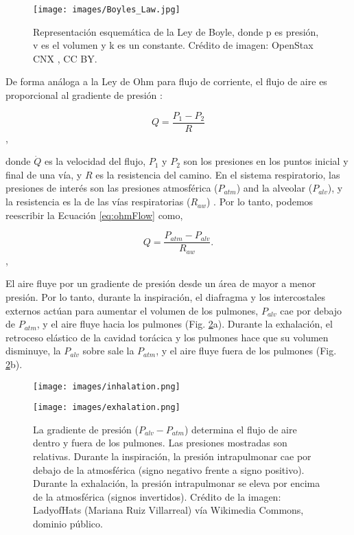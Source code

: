 \documentclass[12pt]{article}
\begin{document}
\begin{figure}[h!]
\centering
\texttt{[image: images/Boyles\_Law.jpg]}
\caption{Representación esquemática de la Ley de Boyle, donde p es
  presión, v es el volumen y k es un constante. Crédito de imagen:
  OpenStax CNX \cite{openStax2016resp}, CC BY.}
\label{fig:boyle}
\end{figure}

De forma análoga a la Ley de Ohm para flujo de corriente, el flujo de
aire es proporcional al gradiente de presión
\cite{sanchez2010respiratory}:

\begin{equation}
Q= \frac{P_1 - P_2}{R}
\label{eq:ohmFlow}
\end{equation},

donde $\dot{Q}$ es la velocidad del flujo, $P_1$ y $P_2$ son los
presiones en los puntos inicial y final de una vía, y $R$ es la
resistencia del camino. En el sistema respiratorio, las presiones de
interés son las presiones atmosférica ($P_{atm}$) and la alveolar
($P_{alv}$), y la resistencia es la de las vías respiratorias
($R_{aw}$) \cite{sanchez2010respiratory}. Por lo tanto, podemos
reescribir la Ecuación \ref{eq:ohmFlow} como,

\begin{equation}
Q= \frac{P_{atm} - P_{alv}}{R_{aw}}.
\label{eq:ohmFlowResp}
\end{equation},

El aire fluye por un gradiente de presión desde un área de mayor a
menor presión. Por lo tanto, durante la inspiración, el diafragma y
los intercostales externos actúan para aumentar el volumen de los
pulmones, $P_{alv}$ cae por debajo de $P_{atm}$, y el aire fluye hacia
los pulmones (Fig. \ref{fig:pressures}a). Durante la exhalación, el
retroceso elástico de la cavidad torácica y los pulmones hace que su
volumen disminuye, la $P_{alv}$ sobre sale la $P_{atm}$, y el aire
fluye fuera de los pulmones (Fig. \ref{fig:pressures}b).

\begin{figure}[h!]
\begin{minipage}{.5\textwidth}
\centering
\texttt{[image: images/inhalation.png]}
\end{minipage}%
\begin{minipage}{.5\textwidth}
\centering
\texttt{[image: images/exhalation.png]}
\end{minipage}
\caption{La gradiente de presión ($P_{alv}-P_{atm}$) determina el
  flujo de aire dentro y fuera de los pulmones. Las presiones
  mostradas son relativas. Durante la inspiración, la presión
  intrapulmonar cae por debajo de la atmosférica (signo negativo
  frente a signo positivo). Durante la exhalación, la presión
  intrapulmonar se eleva por encima de la atmosférica (signos
  invertidos). Crédito de la imagen: LadyofHats (Mariana Ruiz
  Villarreal) vía Wikimedia Commons, dominio público.}
\label{fig:pressures}
\end{figure}
\end{document}
